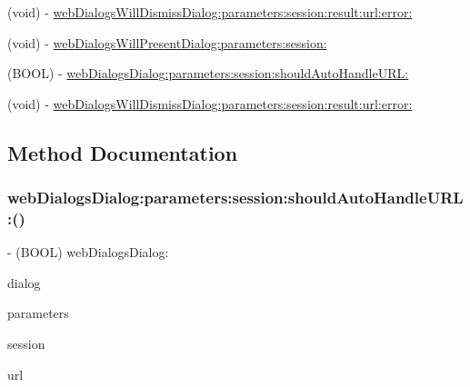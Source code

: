 \begin{DoxyCompactItemize}
(void) -\/ \hyperlink{protocolFBWebDialogsDelegate-p_a548c82f8be08d662c976bbf87d05d34a}{web\+Dialogs\+Will\+Dismiss\+Dialog\+:parameters\+:session\+:result\+:url\+:error\+:}
\item 
(void) -\/ \hyperlink{protocolFBWebDialogsDelegate-p_ac6f3987eabbd6352322ada6819935e1e}{web\+Dialogs\+Will\+Present\+Dialog\+:parameters\+:session\+:}
\item 
(B\+O\+OL) -\/ \hyperlink{protocolFBWebDialogsDelegate-p_afcca4d563c9b0cc120336bdc5bd35218}{web\+Dialogs\+Dialog\+:parameters\+:session\+:should\+Auto\+Handle\+U\+R\+L\+:}
\item 
(void) -\/ \hyperlink{protocolFBWebDialogsDelegate-p_a548c82f8be08d662c976bbf87d05d34a}{web\+Dialogs\+Will\+Dismiss\+Dialog\+:parameters\+:session\+:result\+:url\+:error\+:}
\end{DoxyCompactItemize}


\subsection{Method Documentation}
\mbox{\label{protocolFBWebDialogsDelegate-p_afcca4d563c9b0cc120336bdc5bd35218}} 
\subsubsection{\texorpdfstring{web\+Dialogs\+Dialog\+:parameters\+:session\+:should\+Auto\+Handle\+U\+R\+L\+:()}{webDialogsDialog:parameters:session:shouldAutoHandleURL:()}\hspace{0.1cm}{\footnotesize\ttfamily [1/5]}}
{\footnotesize\ttfamily -\/ (B\+O\+OL) web\+Dialogs\+Dialog\+: \begin{DoxyParamCaption}\item[{(N\+S\+String $\ast$)}]{dialog }\item[{parameters:(N\+S\+Dictionary $\ast$)}]{parameters }\item[{session:(\hyperlink{interfaceFBSession}{F\+B\+Session} $\ast$)}]{session }\item[{shouldAutoHandleURL:(N\+S\+U\+RL $\ast$)}]{url }\end{DoxyParamCaption}\hspace{0.3cm}{\ttfamily [optional]}}

